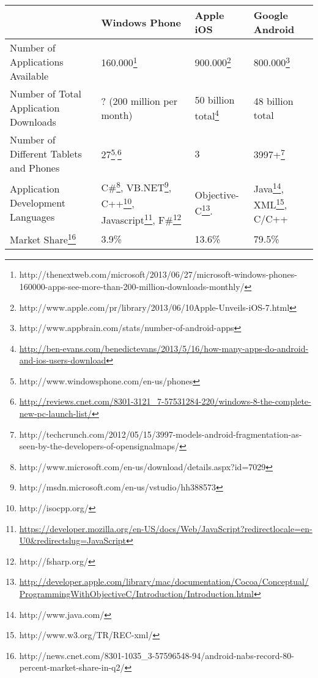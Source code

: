 \begin{center}
	\begin{tabularx}{\textwidth}{| X|X|X|X |}
	\hline
	& Windows Phone & Apple iOS & Google Android\\ \hline
	
	Number of Applications Available 
	& 160.000\footnote{\label{downloads}http://thenextweb.com/microsoft/2013/06/27/microsoft-windows-phones-160000-apps-see-more-than-200-million-downloads-monthly/} 
	& 900.000\footnote{http://www.apple.com/pr/library/2013/06/10Apple-Unveils-iOS-7.html} 	
	& 800.000\footnote{http://www.appbrain.com/stats/number-of-android-apps} \\ \hline
	
	Number of Total Application Downloads 
	& ? (200 million per month\footnotemark{[\ref{downloads}]}) 
	& 50 billion total\footnote{\label{note1}\url{http://ben-evans.com/benedictevans/2013/5/16/how-many-apps-do-android-and-ios-users-download}}
	& 48 billion total\footnotemark{[\ref{note1}]} \\ \hline 

	Number of Different Tablets and Phones 
	& 27\footnote{http://www.windowsphone.com/en-us/phones}$^{,}$\footnote{\url{http://reviews.cnet.com/8301-3121\_7-57531284-220/windows-8-the-complete-new-pc-launch-list/}} 
	& 3 
	& 3997+\footnote{http://techcrunch.com/2012/05/15/3997-models-android-fragmentation-as-seen-by-the-developers-of-opensignalmaps/} \\ \hline
	
	Application Development Languages 
	& C\#\footnote{http://www.microsoft.com/en-us/download/details.aspx?id=7029}, VB.NET\footnote{http://msdn.microsoft.com/en-us/vstudio/hh388573}, C++\footnote{http://isocpp.org/}, Javascript\footnote{\url{https://developer.mozilla.org/en-US/docs/Web/JavaScript?redirectlocale=en-U0\&redirectslug=JavaScript}}, F\#\footnote{http://fsharp.org/} 
	& Objective-C\footnote{\url{http://developer.apple.com/library/mac/documentation/Cocoa/Conceptual/ProgrammingWithObjectiveC/Introduction/Introduction.html}}.
	& Java\footnote{http://www.java.com/}, XML\footnote{http://www.w3.org/TR/REC-xml/}, C/C++ \\ \hline
	
	Market Share\footnote{http://news.cnet.com/8301-1035\_3-57596548-94/android-nabs-record-80-percent-market-share-in-q2/} 		& 3.9\% & 13.6\% & 79.5\% \\ \hline

	\end{tabularx}
\end{center}